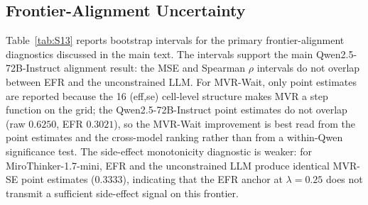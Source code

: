 \documentclass[11pt]{article}
\begin{document}
\subsection{Frontier-Alignment Uncertainty}

Table~\ref{tab:S13} reports bootstrap intervals for the primary frontier-alignment diagnostics discussed in the main text. The intervals support the main Qwen2.5-72B-Instruct alignment result: the MSE and Spearman $\rho$ intervals do not overlap between EFR and the unconstrained LLM. For MVR-Wait, only point estimates are reported because the 16 (eff,se) cell-level structure makes MVR a step function on the grid; the Qwen2.5-72B-Instruct point estimates do not overlap (raw $0.6250$, EFR $0.3021$), so the MVR-Wait improvement is best read from the point estimates and the cross-model ranking rather than from a within-Qwen significance test. The side-effect monotonicity diagnostic is weaker: for MiroThinker-1.7-mini, EFR and the unconstrained LLM produce identical MVR-SE point estimates ($0.3333$), indicating that the EFR anchor at $\lambda=0.25$ does not transmit a sufficient side-effect signal on this frontier.
\end{document}
